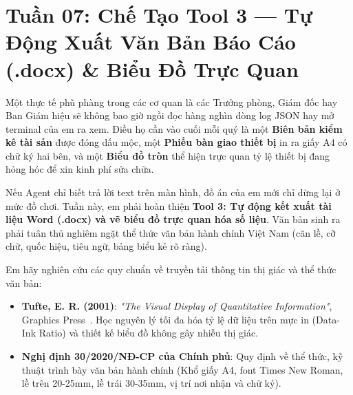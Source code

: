 ﻿\section{Tuần 07: Chế Tạo Tool 3 — Tự Động Xuất Văn Bản Báo Cáo (.docx) \& Biểu Đồ Trực Quan}
\label{sec:tuan_07}

\begin{advisorbox}
Một thực tế phũ phàng trong các cơ quan là các Trưởng phòng, Giám đốc hay Ban Giám hiệu sẽ không bao giờ ngồi đọc hàng nghìn dòng log JSON hay mở terminal của em ra xem. Điều họ cần vào cuối mỗi quý là một \textbf{Biên bản kiểm kê tài sản} được đóng dấu mộc, một \textbf{Phiếu bàn giao thiết bị} in ra giấy A4 có chữ ký hai bên, và một \textbf{Biểu đồ tròn} thể hiện trực quan tỷ lệ thiết bị đang hỏng hóc để xin kinh phí sửa chữa.

Nếu Agent chỉ biết trả lời text trên màn hình, đồ án của em mới chỉ dừng lại ở mức đồ chơi. Tuần này, em phải hoàn thiện \textbf{Tool 3: Tự động kết xuất tài liệu Word (.docx) và vẽ biểu đồ trực quan hóa số liệu}. Văn bản sinh ra phải tuân thủ nghiêm ngặt thể thức văn bản hành chính Việt Nam (căn lề, cỡ chữ, quốc hiệu, tiêu ngữ, bảng biểu kẻ rõ ràng).
\end{advisorbox}

\begin{literaturebox}
Em hãy nghiên cứu các quy chuẩn về truyền tải thông tin thị giác và thể thức văn bản:
\begin{itemize}[leftmargin=1.5em]
    \item \textbf{Tufte, E. R. (2001)}: \textit{"The Visual Display of Quantitative Information"}, Graphics Press~\cite{tufte2001visual}. Học nguyên lý tối đa hóa tỷ lệ dữ liệu trên mực in (Data-Ink Ratio) và thiết kế biểu đồ không gây nhiễu thị giác.
    \item \textbf{Nghị định 30/2020/NĐ-CP của Chính phủ}: Quy định về thể thức, kỹ thuật trình bày văn bản hành chính (Khổ giấy A4, font Times New Roman, lề trên 20-25mm, lề trái 30-35mm, vị trí nơi nhận và chữ ký).
\end{itemize}
\end{literaturebox}

